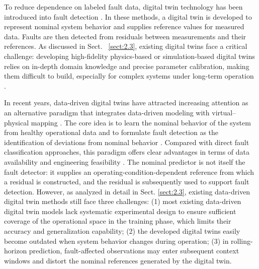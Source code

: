 \documentclass[a4paper,10pt]{cas-sc}%
\newcommand{\rev}[1]{#1}
\newcommand{\roundtworev}[1]{\textcolor{roundtwored}{#1}}
\begin{document}
To reduce dependence on labeled fault data, digital twin technology has been introduced into fault detection \citep{hosamo2022review, darvishi2020sensor}. In these methods, a digital twin is developed to represent nominal system behavior and supplies reference values for measured data. Faults are then detected from residuals between measurements and their references. As discussed in Sect. ~\ref{sect:2.3}, \roundtworev{existing digital twins face a critical challenge:} developing high-fidelity physics-based or simulation-based digital twins relies on in-depth domain knowledge and precise parameter calibration, making them difficult to build, especially for complex systems under long-term operation \citep{HU2025102963, YOU20221471}.

In recent years, data-driven digital twins have attracted increasing attention as an alternative paradigm that integrates data-driven modeling with virtual--physical mapping \citep{teng2021recent, friederich2022framework, 10477658, hui2022digital}. The core idea is to learn the nominal behavior of the system from healthy operational data and to formulate fault detection as the identification of deviations from nominal behavior \citep{Michau_2019}. Compared with direct fault classification approaches, this paradigm offers clear advantages in terms of data availability and engineering feasibility \citep{ZHONG2023e14534}. \rev{The nominal predictor is not itself the fault detector: it supplies an operating-condition-dependent reference from which a residual is constructed, and the residual is subsequently used to support fault detection.} However, as analyzed in detail in Sect. \ref{sect:2.3}, existing data-driven digital twin methods still face three challenges: (1) most existing data-driven digital twin models lack systematic experimental design to ensure sufficient coverage of the operational space in the training phase, which limits their accuracy and generalization capability; (2) the developed digital twins easily become outdated when system behavior changes during operation; (3) \roundtworev{in rolling-horizon prediction, fault-affected observations may enter subsequent context windows and distort the nominal references generated by the digital twin.}
\end{document}
